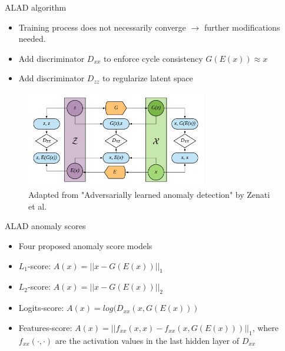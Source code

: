\documentclass{beamer}
\begin{document}
\begin{frame}{ALAD algorithm}
  \begin{itemize}
      \item<1-> Training process does not necessarily converge $\rightarrow$ further modifications needed.
      \item<2-> Add discriminator $D_{xx}$ to enforce cycle consistency $G(E(x))\approx x$
      \item<3-> Add discriminator $D_{zz}$ to regularize latent space
  \end{itemize}
  
  \begin{figure}[!htb]
    \begin{center}
    \includegraphics[width=0.7\textwidth]{dladded}
    \caption{Adapted from "Adversarially learned anomaly detection" by Zenati et al.}
    \label{fig:alad}
    \end{center}
  \end{figure}
\end{frame}

\begin{frame}{ALAD anomaly scores}
  \begin{itemize}
      \item<1-> Four proposed anomaly score models
      \item<2-> $L_1$-score: $A(x)=||x-G(E(x))||_{1}$
      \item<3-> $L_2$-score: $A(x)=||x-G(E(x))||_{2}$
      \item<4-> Logits-score: $A(x)=log(D_{xx}(x, G(E(x)))$
      \item<5-> Features-score: $A(x)=||f_{xx}(x,x) - f_{xx}(x, G(E(x)))||_1$, where $f_{xx}(\cdot,\cdot)$ are the activation values in the last hidden layer of $D_{xx}$
  \end{itemize}
\end{frame}
\end{document}
